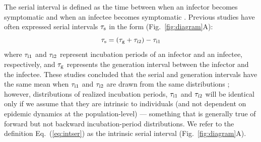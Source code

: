 \documentclass[12pt]{article}
\newcommand{\eref}[1]{Eq.~(\ref{eq:#1})}
\newcommand{\fref}[1]{Fig.~\ref{fig:#1}}
\newcommand{\gtime}{\tau_{\rm g}} %
\begin{document}
The serial interval is defined as the time between when an infector becomes symptomatic and when an infectee becomes symptomatic \citep{svensson2007note}.
Previous studies have often expressed serial intervals $\tau_{\rm s}$ in the form (\fref{diagram}A):
\begin{equation}
\tau_{\rm s} = (\gtime + \tau_{\rm i2}) - \tau_{\rm i1}
\label{eq:intser}
\end{equation}
where $\tau_{\rm i1}$ and $\tau_{\rm i2}$ represent incubation periods of an infector and
an infectee, respectively, and $\gtime$ represents the generation
interval between the infector and the infectee.
These studies concluded that the serial and generation intervals have the same mean when $\tau_{\rm i1}$ and $\tau_{\rm i2}$ are drawn from the same distributions \citep{svensson2007note,klinkenberg2011correlation,champredon2018equivalence, britton2019estimation};
however, distributions of realized incubation periods, $\tau_{\rm i1}$ and $\tau_{\rm i2}$ will be identical only if we assume that they are intrinsic to individuals (and not dependent on epidemic dynamics at the population-level) ---
something that is generally true of forward but not backward incubation-period distributions.
We refer to the definition \eref{intser} as the intrinsic serial interval (\fref{diagram}A).
\end{document}
